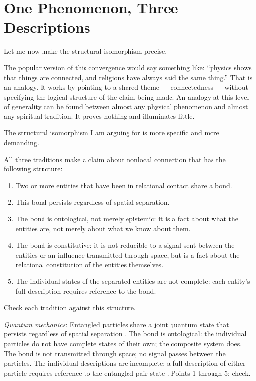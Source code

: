\section{One Phenomenon, Three Descriptions}
\label{sec:ch8-convergence}

Let me now make the structural isomorphism precise.

The popular version of this convergence would say something like: ``physics shows that things are connected, and religions have always said the same thing.'' That is an analogy. It works by pointing to a shared theme --- connectedness --- without specifying the logical structure of the claim being made. An analogy at this level of generality can be found between almost any physical phenomenon and almost any spiritual tradition. It proves nothing and illuminates little.

The structural isomorphism I am arguing for is more specific and more demanding.

All three traditions make a claim about nonlocal connection that has the following structure:

\begin{enumerate}
\item Two or more entities that have been in relational contact share a bond.
\item This bond persists regardless of spatial separation.
\item The bond is ontological, not merely epistemic: it is a fact about what the entities are, not merely about what we know about them.
\item The bond is constitutive: it is not reducible to a signal sent between the entities or an influence transmitted through space, but is a fact about the relational constitution of the entities themselves.
\item The individual states of the separated entities are not complete: each entity's full description requires reference to the bond.
\end{enumerate}

Check each tradition against this structure.

\emph{Quantum mechanics}: Entangled particles share a joint quantum state that persists regardless of spatial separation \citep{Bell1964,Aspect1982,Zeilinger2023Nobel}. The bond is ontological: the individual particles do not have complete states of their own; the composite system does. The bond is not transmitted through space; no signal passes between the particles. The individual descriptions are incomplete: a full description of either particle requires reference to the entangled pair state \citep{NielsenChuang2000}. Points 1 through 5: check.

